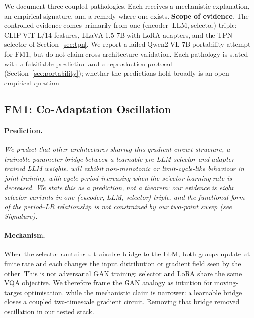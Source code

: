 \documentclass[runningheads]{llncs}
\begin{document}
We document three coupled pathologies. Each receives a mechanistic
explanation, an empirical signature, and a remedy where one exists.
\textbf{Scope of evidence.} The controlled evidence comes primarily
from one (encoder, LLM, selector) triple: CLIP ViT-L/14 features,
LLaVA-1.5-7B with LoRA adapters, and the TPN selector of
Section~\ref{sec:tpn}. We report a failed Qwen2-VL-7B portability
attempt for FM1, but do not claim cross-architecture validation. Each pathology is stated
with a falsifiable prediction and a reproduction protocol
(Section~\ref{sec:portability}); whether the predictions hold broadly
is an open empirical question.

\subsection{FM1: Co-Adaptation Oscillation}
\label{sec:fm1}

\paragraph{Prediction.}
\emph{We predict that other architectures sharing this
gradient-circuit structure, a trainable parameter bridge between a
learnable pre-LLM selector and adapter-trained LLM weights, will
exhibit non-monotonic or limit-cycle-like behaviour in joint training,
with cycle period increasing when the selector learning rate is
decreased.
We state this as a prediction, not a theorem: our evidence is eight
selector variants in one (encoder, LLM, selector) triple, and the
functional form of the period--LR relationship is not constrained by
our two-point sweep (see Signature).}

\paragraph{Mechanism.}
When the selector contains a trainable bridge to the LLM, both groups
update at finite rate and each changes the input distribution or
gradient field seen by the other. This is not adversarial GAN training:
selector and LoRA share the same VQA objective. We therefore frame the
GAN analogy as intuition for moving-target optimisation, while the
mechanistic claim is narrower: a learnable bridge closes a coupled
two-timescale gradient circuit. Removing that bridge removed
oscillation in our tested stack.
\end{document}
